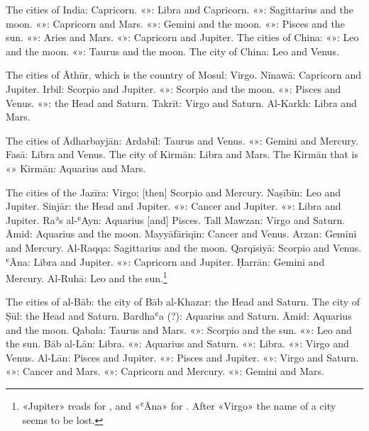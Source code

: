 \documentclass[11pt]{article}
\newcommand{\Fol}[1]{\marginpar{\footnotesize\color{gray}f.\,#1}}
\begin{document}
\par The cities of India: Capricorn. «»: Libra and Capricorn. «»: Sagittarius and the moon. «»: Capricorn and Mars. «»: Gemini and the moon. «»: Pisces and the sun. «»: Aries and Mars. «»: Capricorn and Jupiter. The cities of China: «»: Leo and the moon. «»: Taurus and the moon. The city of China: Leo and Venus.\par
\par The cities of Āthūr, which is the country of Mosul: Virgo. Nīnawā: Capricorn and Jupiter. Irbil: Scorpio and Jupiter. «»: Scorpio and the moon. «»: Pisces and Venus. «»: the Head and Saturn. Takrīt: Virgo and Saturn. Al-Karkh: Libra and Mars.\par
\par \Fol{25r}The cities of Ādharbayjān: Ardabīl: Taurus and Venus. «»: Gemini and Mercury. Fasā: Libra and Venus. The city of Kirmān: Libra and Mars. The Kirmān that is «» Kirmān: Aquarius and Mars.\par
\par The cities of the Jazīra: Virgo; [then] Scorpio and Mercury. Naṣībīn: Leo and Jupiter. Sinjār: the Head and Jupiter. «»: Cancer and Jupiter. «»: Libra and Jupiter. Raʾs al-ʿAyn: Aquarius [and] Pisces. Tall Mawzan: Virgo and Saturn. Āmid: Aquarius and the moon. Mayyāfāriqīn: Cancer and Venus. Arzan: Gemini and Mercury. Al-Raqqa: Sagittarius and the moon. Qarqīsiyā: Scorpio and Venus. ʿĀna: Libra and Jupiter. «»: Capricorn and Jupiter. Ḥarrān: Gemini and Mercury. Al-Ruhā: Leo and the sun.\footnote{«Jupiter» reads  for , and «ʿĀna»  for . After «Virgo» the name of a city seems to be lost.}\par
\par The cities of al-Bāb: the city of Bāb al-Khazar: the Head and Saturn. The city of Ṣūl: the Head and Saturn. Bardhaʿa (?): Aquarius and Saturn. Āmid: Aquarius and the moon. Qabala: Taurus and Mars. «»: Scorpio and the sun. «»: Leo and the sun. Bāb al-Lān: Libra. «»: Aquarius and Saturn. «»: Libra. «»: Virgo and Venus. Al-Lān: Pisces and Jupiter. «»: Pisces and Jupiter. «»: Virgo and Saturn. «»: Cancer and Mars. «»: Capricorn and Mercury. «»: Gemini and Mars.\par
\end{document}
